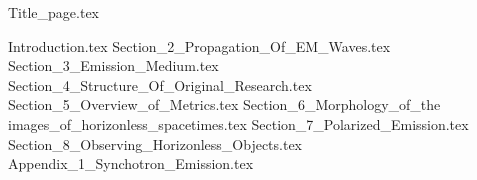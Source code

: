 \documentclass[12pt]{article}
\numberwithin{equation}{section}
\numberwithin{figure}{section}
\begin{document}
\lfoot{}
{Title_page.tex}
\lfoot{}
\tableofcontents
\listoffigures
\listoftables
\newpage
\lfoot{}

\nocite{EHT_M87_I,
		EHT_M87_II,
		EHT_M87_III,
		EHT_M87_IV,
		EHT_M87_V,
		EHT_M87_VI,
		EHT_M87_VII,
		EHT_M87_VIII,
		EHT_M87_IX,
		EHT_SGR_I,
		EHT_SGR_II,
		EHT_SGR_III,
		EHT_SGR_IV,
		EHT_SGR_V,
		EHT_SGR_VI,
		EHT_SGR_VII,
		EHT_SGR_VIII}

{Introduction.tex}
\newpage
\lfoot{}
{Section_2_Propagation_Of_EM_Waves.tex}
\newpage
\lfoot{}
{Section_3_Emission_Medium.tex}
\newpage
\lfoot{}
{Section_4_Structure_Of_Original_Research.tex}
\newpage
\lfoot{}
{Section_5_Overview_of_Metrics.tex}
\newpage
\lfoot{}
{Section_6_Morphology_of_the images_of_horizonless_spacetimes.tex}
\newpage
\lfoot{}
{Section_7_Polarized_Emission.tex}
\newpage
\lfoot{}
{Section_8_Observing_Horizonless_Objects.tex}
\newpage
\lfoot{}
{Appendix_1_Synchotron_Emission.tex}
\lfoot{}





\end{document}
